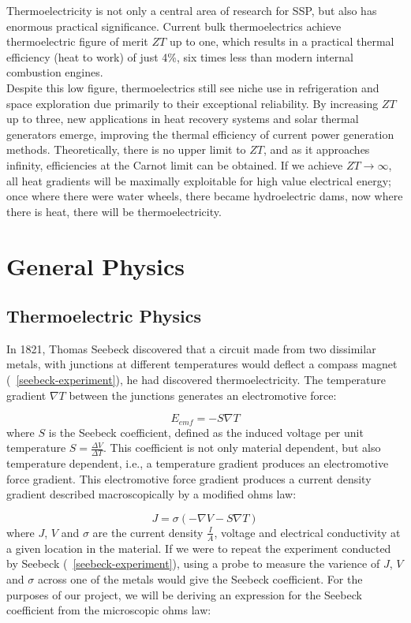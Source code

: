 \documentclass[a4paper,10pt,journal]{IEEEtran}
\newcommand{\figref}[2][\figurename~]{#1\ref{#2}}
\begin{document}
Thermoelectricity is not only a central area of research for
\ac{SSP}, but also has enormous practical significance. Current
bulk thermoelectrics achieve thermoelectric figure of merit $ZT$ up to
one, which results in a practical thermal efficiency (heat to work) of
just 4\%, six times less than modern internal combustion engines.\\
Despite this low figure, thermoelectrics still see niche use
in refrigeration and space exploration due primarily to their
exceptional reliability. By increasing $ZT$ up to three, new
applications in heat recovery systems and solar thermal generators
emerge, improving the thermal efficiency of current power generation
methods. Theoretically, there is no upper limit to $ZT$, and as it
approaches infinity, efficiencies at the Carnot limit can be obtained.
If we achieve $ZT \to\infty$, all heat gradients will be maximally
exploitable for high value electrical energy; once where there were
water wheels, there became hydroelectric dams, now where there is
heat, there will be thermoelectricity.

\section{General Physics}
\subsection{Thermoelectric Physics}
In 1821, Thomas Seebeck discovered that a circuit made from two
dissimilar metals, with junctions at different temperatures would
deflect a compass magnet (\figref{seebeck-experiment}), he had
discovered thermoelectricity. The temperature gradient $\nabla
T$ between the junctions generates an electromotive force:

\begin{equation}
\label{seebeck-emf}
	E_{emf} = -S \nabla T
\end{equation}
where $S$ is the Seebeck coefficient, defined as the induced voltage per
unit temperature $S = \frac{\Delta V}{\Delta T}$. This coefficient is
not only material dependent, but also temperature dependent, i.e., a
temperature gradient produces an electromotive force gradient. This
electromotive force gradient produces a current density gradient
described macroscopically by a modified ohms law:

\begin{equation}
\label{current-density}
	J = \sigma (-\nabla V - S \nabla T)
\end{equation}
where $J$, $V$ and $\sigma$ are the current density $\frac{I}{A}$,
voltage and electrical conductivity at a given location in the
material. If we were to repeat the experiment conducted by Seebeck
(\figref{seebeck-experiment}), using a probe to measure the varience
of $J$, $V$ and $\sigma$ across one of the metals would give the
Seebeck coefficient.
For the purposes of our project, we will be deriving an expression for
the Seebeck coefficient from the microscopic ohms law:
\end{document}
